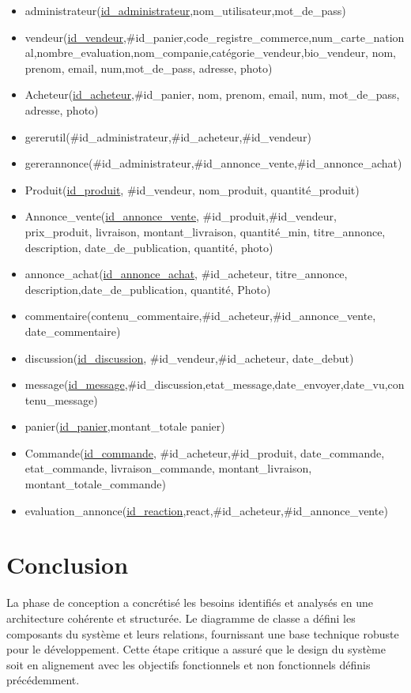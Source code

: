 \documentclass[edit,12pt,a4paper,ChapStyle,oneside,doubleinterligne]{report}
\begin{document}
\begin{itemize}
    \item administrateur(\underline{id\_administrateur},nom\_utilisateur,mot\_de\_pass)
    \item vendeur(\underline{id\_vendeur},\#id\_panier,code\_registre\_commerce,num\_carte\_national,\newline nombre\_evaluation,nom\_companie,catégorie\_vendeur,bio\_vendeur, nom, prenom, email, num,mot\_de\_pass, adresse, photo)
    \item Acheteur(\underline{id\_acheteur},\#id\_panier, nom, prenom, email, num, mot\_de\_pass, adresse, photo)
    \item gererutil(\#id\_administrateur,\#id\_acheteur,\#id\_vendeur)
    \item gererannonce(\#id\_administrateur,\#id\_annonce\_vente,\#id\_annonce\_achat)
    \item Produit(\underline{id\_produit}, \#id\_vendeur, nom\_produit, quantité\_produit)
    \item Annonce\_vente(\underline{id\_annonce\_vente}, \#id\_produit,\#id\_vendeur, prix\_produit, livraison, montant\_livraison, quantité\_min, titre\_annonce, description, date\_de\_publication, quantité, photo)
    \item annonce\_achat(\underline{id\_annonce\_achat}, \#id\_acheteur, titre\_annonce, description,\newline date\_de\_publication, quantité, Photo)
    \item commentaire(contenu\_commentaire,\#id\_acheteur,\#id\_annonce\_vente, date\_commentaire)
    \item discussion(\underline{id\_discussion}, \#id\_vendeur,\#id\_acheteur, date\_debut)
    \item message(\underline{id\_message},\#id\_discussion,etat\_message,date\_envoyer,date\_vu,contenu\_message)
    \item panier(\underline{id\_panier},montant\_totale panier)
    \item Commande(\underline{id\_commande}, \#id\_acheteur,\#id\_produit, date\_commande, etat\_commande, livraison\_commande, montant\_livraison, montant\_totale\_commande)
    \item evaluation\_annonce(\underline{id\_reaction},react,\#id\_acheteur,\#id\_annonce\_vente)
\end{itemize}
\section{Conclusion}
La phase de conception a concrétisé les besoins identifiés et analysés en une architecture cohérente et structurée. Le diagramme de classe a défini les composants du système et leurs relations, fournissant une base technique robuste pour le développement. Cette étape critique a assuré que le design du système soit en alignement avec les objectifs fonctionnels et non fonctionnels définis précédemment.
\end{document}
